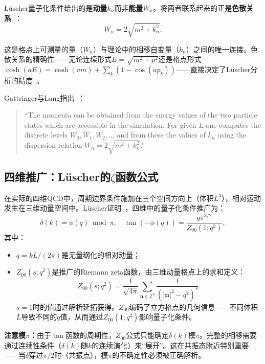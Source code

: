 \documentclass[12pt,a4paper]{ctexart}
\theoremstyle{definition}
\begin{document}
L\"uscher量子化条件给出的是\textbf{动量}$k_n$而非\textbf{能量}$W_n$。将两者联系起来的正是\textbf{色散关系}~\cite{GattringerLang2010,dispersion2026}：
\begin{equation}\label{eq:dispersion_Luscher}
    \boxed{W_n = 2\sqrt{m^2 + k_n^2}}.
\end{equation}

这是格点上可测量的量（$W_n$）与理论中的相移自变量（$k_n$）之间的唯一连接。色散关系的精确性——无论连续形式$E = \sqrt{m^2 + p^2}$还是格点形式$\cosh(aE) = \cosh(am) + \sum_k(1 - \cos(ap_k))$——直接决定了L\"uscher分析的精度~\cite{dispersion2026}。

Gattringer与Lang指出~\cite{GattringerLang2010}：
\begin{quote}
``The momenta can be obtained from the energy values of the two particle states which are accessible in the simulation. For given $L$ one computes the discrete levels $W_0, W_1, W_2, \ldots$ and from these the values of $k_n$ using the dispersion relation $W_n = 2\sqrt{m^2 + k_n^2}$.''
\end{quote}

\subsection{四维推广：L\"uscher的$\zeta$函数公式}

在实际的四维QCD中，周期边界条件施加在三个空间方向上（体积$L^3$），相对运动发生在三维动量空间中。L\"uscher证明~\cite{GattringerLang2010}，四维中的量子化条件推广为：
\begin{equation}\label{eq:Luscher_4d}
    \boxed{\delta(k) = \phi(q) \bmod \pi, \quad \tan(-\phi(q)) = \frac{q\pi^{3/2}}{Z_{00}(1; q^2)},}
\end{equation}
其中：
\begin{itemize}[leftmargin=*]
    \item $q = kL/(2\pi)$是无量纲化的相对动量；
    \item $Z_{00}(s; q^2)$是推广的Riemann zeta函数，由三维动量格点上的求和定义：
    \begin{equation}\label{eq:zeta_def}
        Z_{00}(s; q^2) = \frac{1}{\sqrt{4\pi}} \sum_{\mathbf{n} \in \mathbb{Z}^3} \frac{1}{(|\mathbf{n}|^2 - q^2)^s}.
    \end{equation}
    $s=1$时的值通过解析延拓获得。$Z_{00}$编码了立方格点的几何信息——不同体积$L$导致不同的$q$值，从而通过$Z_{00}(1; q^2)$影响量子化条件。
\end{itemize}

\textbf{注意模$\pi$：}由于$\tan$函数的周期性，$Z_{00}$公式只能确定$\delta(k)$模$\pi$。完整的相移需要通过连续性条件（$\delta(k)$随$k$的连续演化）来``展开''。这在共振态附近特别重要——当$\delta$穿过$\pi/2$时（共振点），模$\pi$的不确定性必须被正确解析。
\end{document}
